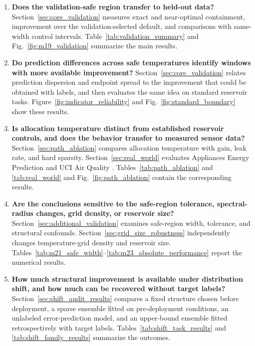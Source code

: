 \documentclass[11pt,a4paper]{article}
\begin{document}
\begin{enumerate}[leftmargin=*]
\item \textbf{Does the validation-safe region transfer to held-out data?} Section~\ref{sec:core_validation} measures exact and near-optimal containment, improvement over the validation-selected default, and comparisons with same-width control intervals. Table~\ref{tab:validation_summary} and Fig.~\ref{fig:m19_validation} summarize the main results.

\item \textbf{Do prediction differences across safe temperatures identify windows with more available improvement?} Section~\ref{sec:core_validation} relates prediction dispersion and endpoint spread to the improvement that could be obtained with labels, and then evaluates the same idea on standard reservoir tasks. Figure~\ref{fig:indicator_reliability} and Fig.~\ref{fig:standard_boundary} show these results.

\item \textbf{Is allocation temperature distinct from established reservoir controls, and does the behavior transfer to measured sensor data?} Section~\ref{sec:path_ablation} compares allocation temperature with gain, leak rate, and hard sparsity. Section~\ref{sec:real_world} evaluates Appliances Energy Prediction and UCI Air Quality \citep{candanedo2017accurate,devito2008field}. Tables~\ref{tab:path_ablation} and \ref{tab:real_world} and Fig.~\ref{fig:path_ablation} contain the corresponding results.

\item \textbf{Are the conclusions sensitive to the safe-region tolerance, spectral-radius changes, grid density, or reservoir size?} Section~\ref{sec:additional_validation} examines safe-region width, tolerance, and structural confounds. Section~\ref{sec:grid_size_robustness} independently changes temperature-grid density and reservoir size. Tables~\ref{tab:m21_safe_width}--\ref{tab:m23_absolute_performance} report the numerical results.

\item \textbf{How much structural improvement is available under distribution shift, and how much can be recovered without target labels?} Section~\ref{sec:shift_audit_results} compares a fixed structure chosen before deployment, a sparse ensemble fitted on pre-deployment conditions, an unlabeled error-prediction model, and an upper-bound ensemble fitted retrospectively with target labels. Tables~\ref{tab:shift_task_results} and \ref{tab:shift_family_results} summarize the outcomes.
\end{enumerate}
\end{document}
